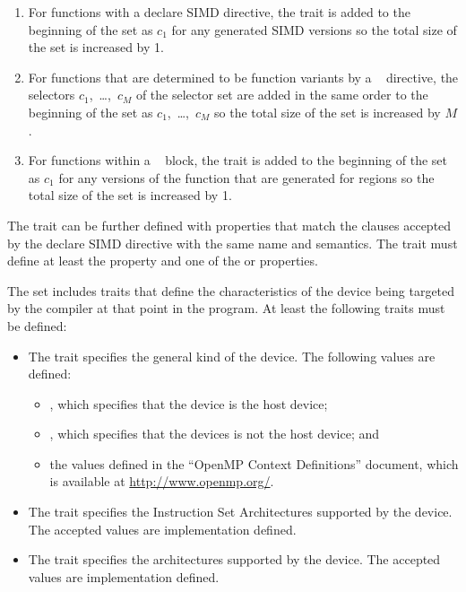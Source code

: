 \begin{enumerate}
\item For functions with a declare SIMD directive, the  trait
      is added to the beginning of the set as $c_{1}$ for any generated SIMD
      versions so the total size of the set is increased by 1.
\item For functions that are determined to be function variants by a
      ~ directive, the selectors 
      $c_{1}$,~\ldots,~$c_{M}$ of the  selector set are added
      in the same order to the beginning of the set as $c_{1}$,~\ldots,~$c_{M}$
      so the total size of the set is increased by $M$.
\item For functions within a ~ block, the 
      trait is added to the beginning of the set as $c_{1}$ for any versions of 
      the function that are generated for  regions so the total 
      size of the set is increased by 1.
\end{enumerate}

The  trait can be further defined with properties that match the
clauses accepted by the declare SIMD directive with the same
name and semantics. The  trait must define at least the
 property and one of  the  or  properties.

The  set includes traits that define the characteristics of the 
device being targeted by the compiler at that point in the program. At least 
the following traits must be defined:

\begin{itemize}
\item The  trait specifies the general kind of the 
      device. The following  values are defined:

\begin{itemize}
\item {}, which specifies that the device is the host device;
\item {}, which specifies that the devices is not the host device; and
\item the values defined in the ``OpenMP Context Definitions'' document,
      which is available at \url{http://www.openmp.org/}.
\end{itemize}

\item The  trait specifies the Instruction Set 
      Architectures supported by the device. The accepted  
      values are implementation defined.
\item The  trait specifies the architectures 
     supported by the device. The accepted  values are 
      implementation defined.
\end{itemize}

